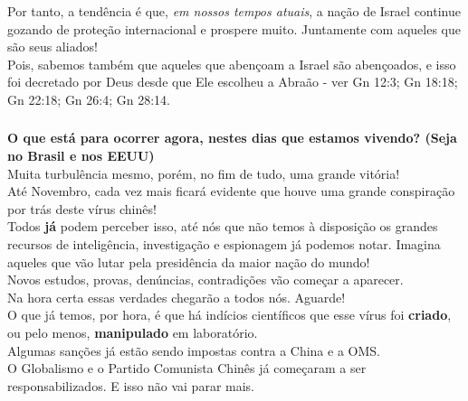 \documentclass[aspectratio=169]{beamer}
\begin{document}
	

\begin{frame}
	  \frametitle{}
	  \framesubtitle{}
	    \centering
		Por tanto, a tendência é que, \textit{em nossos tempos atuais}, a nação de Israel continue gozando de proteção internacional e prospere muito. Juntamente com aqueles que são seus aliados! \\
		\vspace{.5cm}
	Pois, sabemos também que aqueles que abençoam a Israel são abençoados, e isso foi decretado por Deus desde que Ele escolheu a Abraão - ver Gn 12:3; Gn 18:18; Gn 22:18; Gn 26:4; Gn 28:14.\\
	\end{frame}
	
	

\begin{frame}
\small 
    \frametitle{}
    \framesubtitle{}
      \centering
{\large \textbf{O que está para ocorrer agora, nestes dias que estamos vivendo? (Seja no Brasil e nos EEUU)}}\\
  Muita turbulência mesmo, porém, no fim de tudo, uma grande vitória!\\
	Até Novembro, cada vez mais ficará evidente que houve uma grande conspiração por trás deste vírus chinês!\\
	\vspace{.5cm}
	Todos \textbf{já} podem perceber isso, até nós que não temos à disposição os grandes recursos de inteligência, investigação e espionagem já podemos notar. Imagina aqueles que vão lutar pela presidência da maior nação do mundo! \\
	Novos estudos, provas, denúncias, contradições vão começar a aparecer.\\
	Na hora certa essas verdades chegarão a todos nós. Aguarde! \\
		\vspace{.5cm}
	O que já temos, por hora, é que há indícios científicos que esse vírus foi \textbf{criado}, ou pelo menos, \textbf{manipulado} em laboratório. \\
	Algumas sanções já estão sendo impostas contra a China e a OMS.\\
	O Globalismo e o Partido Comunista Chinês já começaram a ser responsabilizados. E isso não vai parar mais.
  \end{frame}
	
\end{document}
